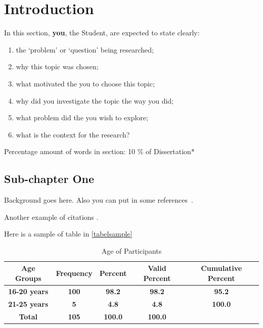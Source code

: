 
\chapter{Introduction}
\begin{spacing}{2.0}

In this section, \textbf{you}, the Student, are expected to state clearly:
\begin{enumerate}[label=(\alph*)]
    \item the `problem’ or `question’ being researched;
    \item why this topic was chosen;
    \item what motivated the you to choose this topic;
    \item why did you investigate the topic the way you did;
    \item what problem did the you wish to explore;
    \item what is the context for the research?
\end{enumerate}
Percentage amount of words in section: 10 \% of Dissertation*

\section{Sub-chapter One}


Background goes here. Also you can put in some references~\cite{ronneberger2015unet}.

Another example of citations \cite{latex2e,ronneberger2015unet}.

Here is a sample of table in \autoref{tabelsample}


\begin{table}[ht]
\centering
{}
{\def\arraystretch{1.5}
    \begin{tabular}{|c|c|c|c|c|} 
    \hline
    
    \textbf{Age Groups}  & \textbf{Frequency} & \textbf{Percent} & \textbf{Valid Percent} & \textbf{Cumulative Percent}  \\[5pt]
    
    \hline 
    \textbf{16-20 years} & \textbf{100}       & \textbf{98.2}    & \textbf{98.2}          & \textbf{95.2}                \\ 
    \hline
    \textbf{21-25 years} & \textbf{5}         & \textbf{4.8}     & \textbf{4.8}           & \textbf{100.0}               \\ 
    \hline
    \textbf{Total}       & \textbf{105}       & \textbf{100.0}   & \textbf{100.0}         &                              \\
    \hline
    \end{tabular}
}
\caption{Age of Participants}
\label{tabelsample}
\end{table}




\end{spacing}
